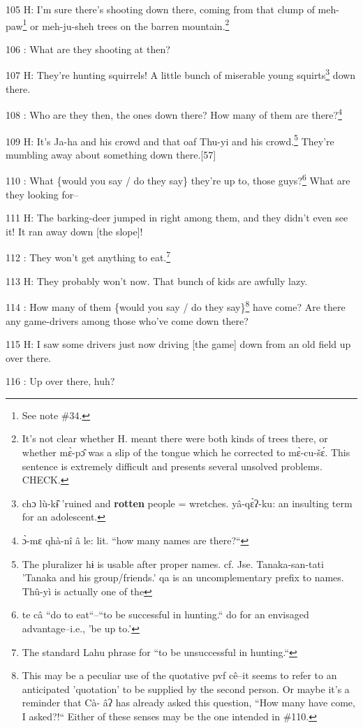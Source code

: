105 H: I'm sure there's shooting down there, coming from that clump of meh-paw\footnote{See note \#34.}
or meh-ju-sheh trees on the barren mountain.\footnote{It's not clear whether H. meant there were both kinds of trees there, or whether mɛ̀-pɔ̂ was a slip of the tongue which he corrected to mɛ̀-cu-šɛ́. This sentence is extremely difficult and presents several unsolved problems. CHECK.}

106  : What are they shooting at then?

107 H: They're hunting squirrels! A little bunch of miserable young squirts\footnote{chɔ lù-kɨ̂ 'ruined and \textbf{rotten} people = wretches.  yâ-qɛ̀ʔ-ku: an insulting term for an adolescent.}
down there.

108  : Who are they then, the ones down there? How many of them are there?\footnote{ɔ̀-mɛ qhà-nî  â le: lit. ``how many names are there?``}

109 H: It's Ja-ha and his crowd and that oaf Thu-yi and his crowd.\footnote{The pluralizer hɨ is usable after proper names. cf. Jse. Tanaka-san-tati 'Tanaka and his group/friends.' qa is an uncomplementary prefix to names. Thû-yì is actually one of the} They're
mumbling away about something down there.[57]

110  : What \{would you say / do they say\} they're up to, those guys?\footnote{te câ ``do to eat``--``to be successful in hunting.`` do for an envisaged advantage--i.e., 'be up to.'}  What
are they looking for--

111 H: The barking-deer jumped in right among them, and they didn't even see it!
It ran away down [the slope]!

112  : They won't get anything to eat.\footnote{The standard Lahu phrase for ``to be unsuccessful in hunting.``}

113 H: They probably won't now. That bunch of kids are awfully lazy.

114  : How many of them \{would you say / do they say\}\footnote{This may be a peculiar use of the quotative pvf cê--it seems to refer to an anticipated 'quotation' to be supplied by the second person. Or maybe it's a reminder that Cà- âʔ has already asked this question, ``How many have come, I asked?!`` Either of these senses may be the one intended in \#110.} have come? Are there
any game-drivers among those who've come down there?

115 H: I saw some drivers just now driving [the game] down from an old field up
over there.

116  : Up over there, huh?

